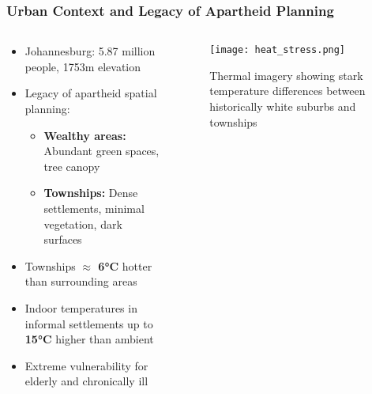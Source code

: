 \documentclass[aspectratio=169]{beamer}
\newcommand{\concept}[1]{\textcolor{witsteal}{\textbf{#1}}}
\newcommand{\statistic}[1]{\textcolor{witsaccent}{\textbf{#1}}}
\begin{document}
\begin{frame}
    \frametitle{Urban Context and Legacy of Apartheid Planning}
    
    \begin{columns}[T]
        \begin{column}{0.55\textwidth}
            \begin{itemize}[leftmargin=*, itemsep=8pt]
                \item Johannesburg: 5.87 million people, 1753m elevation
                \item Legacy of apartheid spatial planning:
                \begin{itemize}[itemsep=6pt]
                    \item \concept{Wealthy areas:} Abundant green spaces, tree canopy
                    \item \concept{Townships:} Dense settlements, minimal vegetation, dark surfaces
                \end{itemize}
            \end{itemize}
            
            \begin{tcolorbox}[colback=witsteal!10, colframe=witsteal, title=Temperature Disparities]
                \begin{itemize}[leftmargin=*, itemsep=6pt]
                    \item Townships \statistic{$\approx$ 6°C} hotter than surrounding areas
                    \item Indoor temperatures in informal settlements up to \statistic{15°C} higher than ambient
                    \item Extreme vulnerability for elderly and chronically ill
                \end{itemize}
            \end{tcolorbox}
        \end{column}
        \begin{column}{0.42\textwidth}
            \begin{figure}
                \texttt{[image: heat\_stress.png]}
                \caption{\small Thermal imagery showing stark temperature differences between historically white suburbs and townships}
            \end{figure}
        \end{column}
    \end{columns}
\end{frame}
\end{document}
